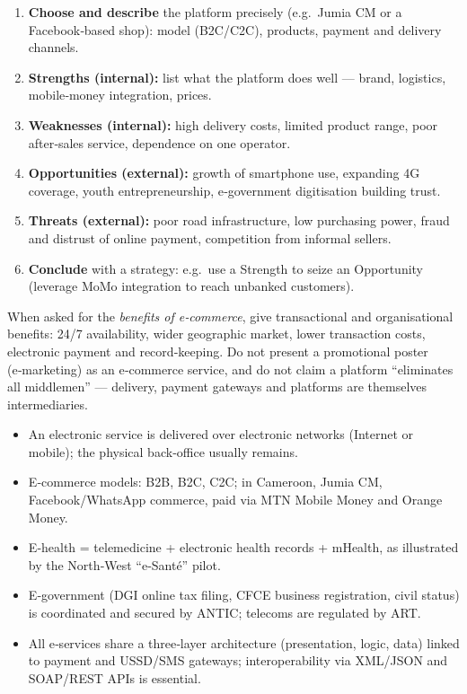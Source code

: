\documentclass[11pt]{article}
\newcommand{\cle}[1]{{\popxbold\color{popdark}#1}}
\begin{document}
\begin{methode}
\begin{enumerate}
\item \textbf{Choose and describe} the platform precisely (e.g.\ Jumia CM or a Facebook‑based shop): model (B2C/C2C), products, payment and delivery channels.
\item \textbf{Strengths (internal):} list what the platform does well — brand, logistics, mobile‑money integration, prices.
\item \textbf{Weaknesses (internal):} high delivery costs, limited product range, poor after‑sales service, dependence on one operator.
\item \textbf{Opportunities (external):} growth of smartphone use, expanding 4G coverage, youth entrepreneurship, e‑government digitisation building trust.
\item \textbf{Threats (external):} poor road infrastructure, low purchasing power, fraud and distrust of online payment, competition from informal sellers.
\item \textbf{Conclude} with a strategy: e.g.\ use a Strength to seize an Opportunity (leverage MoMo integration to reach unbanked customers).
\end{enumerate}
\end{methode}

\begin{attention}
When asked for the \emph{benefits of e‑commerce}, give transactional and organisational benefits: 24/7 availability, wider geographic market, lower transaction costs, electronic payment and record‑keeping. Do not present a promotional poster (e‑marketing) as an e‑commerce service, and do not claim a platform ``eliminates all middlemen'' — delivery, payment gateways and platforms are themselves intermediaries.
\end{attention}

\begin{aretenir}
\begin{itemize}
\item An \cle{electronic service} is delivered over electronic networks (Internet or mobile); the physical back‑office usually remains.
\item E‑commerce models: \cle{B2B}, \cle{B2C}, \cle{C2C}; in Cameroon, Jumia CM, Facebook/WhatsApp commerce, paid via MTN Mobile Money and Orange Money.
\item \cle{E‑health} = telemedicine + electronic health records + mHealth, as illustrated by the North‑West ``e‑Santé'' pilot.
\item \cle{E‑government} (DGI online tax filing, CFCE business registration, civil status) is coordinated and secured by \cle{ANTIC}; telecoms are regulated by \cle{ART}.
\item All e‑services share a \cle{three‑layer architecture} (presentation, logic, data) linked to payment and USSD/SMS gateways; \cle{interoperability} via XML/JSON and SOAP/REST APIs is essential.
\end{itemize}
\end{aretenir}
\end{document}
